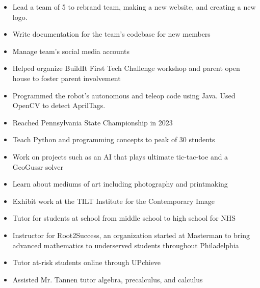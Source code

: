\documentclass[9pt,letterpaper,ragged2e,withhyper]{altacv}
\begin{document}
\begin{paracol}{2}

\begin{itemize}
\item Lead a team of 5 to rebrand team, making a new website, and creating a new logo.
\item Write documentation for the team's codebase for new members
\item Manage team's social media accounts
\item Helped organize BuildIt First Tech Challenge workshop and parent open house to foster parent involvement
\item Programmed the robot's autonomous and teleop code using Java. Used OpenCV to detect AprilTags.
\item Reached Pennsylvania State Championship in 2023
\end{itemize}

\divider

\begin{itemize}
\item Teach Python and programming concepts to peak of 30 students
\item Work on projects such as an AI that plays ultimate tic-tac-toe and a GeoGussr solver
\end{itemize}

\divider

\begin{itemize}
\item Learn about mediums of art including photography and printmaking
\item Exhibit work at the TILT Institute for the Contemporary Image
\end{itemize}

\divider

\begin{itemize}
\item Tutor for students at school from middle school to high school for NHS
\item Instructor for Root2Success, an organization started at Masterman to bring advanced mathematics to underserved students throughout Philadelphia
\item Tutor at-risk students online through UPchieve
\item Assisted Mr. Tannen tutor algebra, precalculus, and calculus
\end{itemize}


\end{paracol}
\end{document}
